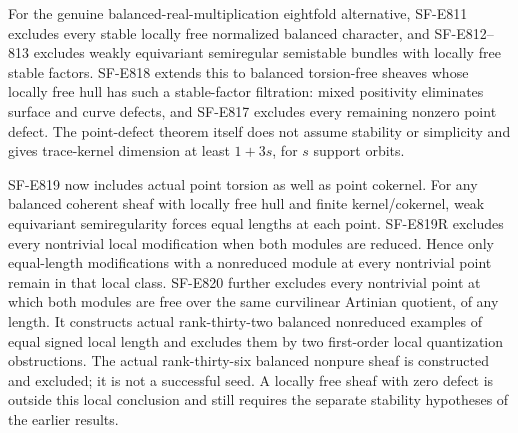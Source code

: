 \documentclass[11pt]{article}
\theoremstyle{remark}\newtheorem{remark}[theorem]{Remark}
\begin{document}
For the genuine balanced-real-multiplication eightfold alternative,
SF-E811 excludes every stable locally free normalized balanced character,
and SF-E812--813 excludes weakly equivariant semiregular semistable
bundles with locally free stable factors. SF-E818 extends this to
balanced torsion-free sheaves whose locally free hull has such a
stable-factor filtration: mixed positivity eliminates surface and curve
defects, and SF-E817 excludes every remaining nonzero point defect.
The point-defect theorem itself does not assume stability or simplicity
and gives trace-kernel dimension at least $1+3s$, for $s$ support orbits.

SF-E819 now includes actual point torsion as well as point cokernel.
For any balanced coherent sheaf with locally free hull and finite
kernel/cokernel, weak equivariant semiregularity forces equal lengths
at each point. SF-E819R excludes every nontrivial local modification
when both modules are reduced. Hence only equal-length modifications
with a nonreduced module at every nontrivial point remain in that local
class. SF-E820 further excludes every nontrivial point at which both
modules are free over the same curvilinear Artinian quotient, of any
length. It constructs actual rank-thirty-two balanced nonreduced
examples of equal signed local length and excludes them by two
first-order local quantization obstructions. The actual rank-thirty-six balanced nonpure sheaf is constructed
and excluded; it is not a successful seed. A locally free sheaf with
zero defect is outside this local conclusion and still requires the
separate stability hypotheses of the earlier results.
\end{document}
